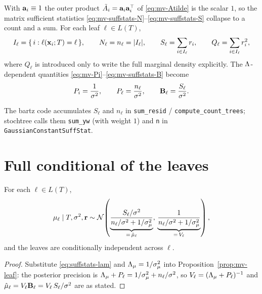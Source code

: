 With $\mathbf{a}_i \equiv 1$ the outer product $\tilde{A}_i = \mathbf{a}_i\mathbf{a}_i^\top$ of
\eqref{eq:mv-Atilde} is the scalar $1$, so the matrix sufficient statistics
\eqref{eq:mv-suffstats-N}--\eqref{eq:mv-suffstats-S} collapse to a count and
a sum. For each leaf $\ell \in L(T)$,
\begin{equation}
	\label{eq:suffstats}
	I_\ell = \{\, i : \ell(\mathbf{x}_i; T) = \ell \,\},
	\qquad
	N_\ell = n_\ell = |I_\ell|,
	\qquad
	S_\ell = \sum_{i \in I_\ell} r_i,
	\qquad
	Q_\ell = \sum_{i \in I_\ell} r_i^{2},
\end{equation}
where $Q_\ell$ is introduced only to write the full marginal density
explicitly. The $\Lambda$-dependent quantities
\eqref{eq:mv-Pi}--\eqref{eq:mv-suffstats-B} become
\begin{equation}
	\label{eq:suffstats-lam}
	P_i = \frac{1}{\sigma^{2}},
	\qquad
	P_\ell = \frac{n_\ell}{\sigma^{2}},
	\qquad
	\mathbf{B}_\ell = \frac{S_\ell}{\sigma^{2}}.
\end{equation}

The bartz code accumulates $S_\ell$ and $n_\ell$ in
\texttt{sum\_resid} / \texttt{compute\_count\_trees}; stochtree calls them
\texttt{sum\_yw} (with weight $1$) and \texttt{n} in
\texttt{GaussianConstantSuffStat}.

\section{Full conditional of the leaves}
\label{sec:full-cond}

\begin{prop}
	\label{prop:leaf}
	For each $\ell \in L(T)$,
	\begin{equation}
		\label{eq:leaf-fc}
		\mu_\ell \mid T, \sigma^{2}, \mathbf{r} \sim
		\mathcal{N}\!\left(
		\underbrace{\frac{S_\ell/\sigma^{2}}{n_\ell/\sigma^{2} + 1/\sigma_\mu^{2}}}_{=\,\hat\mu_\ell}
		,\,
		\underbrace{\frac{1}{n_\ell/\sigma^{2} + 1/\sigma_\mu^{2}}}_{=\,V_\ell}
		\right),
	\end{equation}
	and the leaves are conditionally independent across $\ell$.
\end{prop}

\begin{proof}
	Substitute \eqref{eq:suffstats-lam} and $\Lambda_{\mu} = 1/\sigma_\mu^{2}$ into
	Proposition~\ref{prop:mv-leaf}: the posterior precision is
	$\Lambda_{\mu} + P_\ell = 1/\sigma_\mu^{2} + n_\ell/\sigma^{2}$, so
	$V_\ell = (\Lambda_{\mu} + P_\ell)^{-1}$ and
	$\hat\mu_\ell = V_\ell\mathbf{B}_\ell = V_\ell\,S_\ell/\sigma^{2}$ are as stated.
\end{proof}

